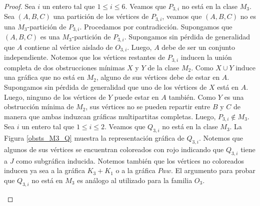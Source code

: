 \begin{proof}
Sea $i$ un entero tal que $1\le i \le 6$. Veamos que $P_{3,i}$ no está en la clase $M_3$. Sea $(A,B,C)$ una partición de los vértices de $P_{3,i}$, veamos que $(A,B,C)$ no es una $M_3$-partición de $P_{3,i}$. Procedamos por contradicción. Supongamos que $(A,B,C)$ es una $M_3$-partición de $P_{3,i}$. Supongamos sin pérdida de generalidad que $A$ contiene al vértice aislado de $O_{3,i}$. Luego, $A$ debe de ser un conjunto independiente. Notemos que los vértices restantes de $P_{3,i}$ inducen la unión completa de dos obstrucciones mínimas $X$ y $Y$ de la clase $M_2$. Como $X\cup Y$ induce una gráfica que no está en $M_2$, alguno de sus vértices debe de estar en $A$. Supongamos sin pérdida de generalidad que uno de los vértices de $X$ está en $A$. Luego, ninguno de los vértices de $Y$ puede estar en $A$ también. Como $Y$ es una obstrucción mínima de $M_2$, sus vértices no se pueden repartir entre $B$ y $C$ de manera que ambas induzcan gráficas multipartitas completas. Luego, $P_{3,i}\notin M_3$.
Sea $i$ un entero tal que $1\le i \le 2$. Veamos que $Q_{3,i}$ no está en la clase $M_3$. La Figura \ref{obsts_M3_Q} muestra la representación gráfica de $Q_{3,i}$. Notemos que algunos de sus vértices se encuentran coloreados con rojo indicando que $Q_{3,i}$ tiene a $J$ como subgráfica inducida. Notemos también que los vértices no coloreados inducen ya sea a la gráfica $K_3+K_1$ o a la gráfica $Paw$. El argumento para probar que $Q_{3,i}$ no está en $M_3$ es análogo al utilizado para la familia $O_3$.

\begin{figure}[ht!]

\begin{subfigure}{\textwidth}
\begin{center}
\end{center}
\end{subfigure}
\end{figure}
\end{proof}
